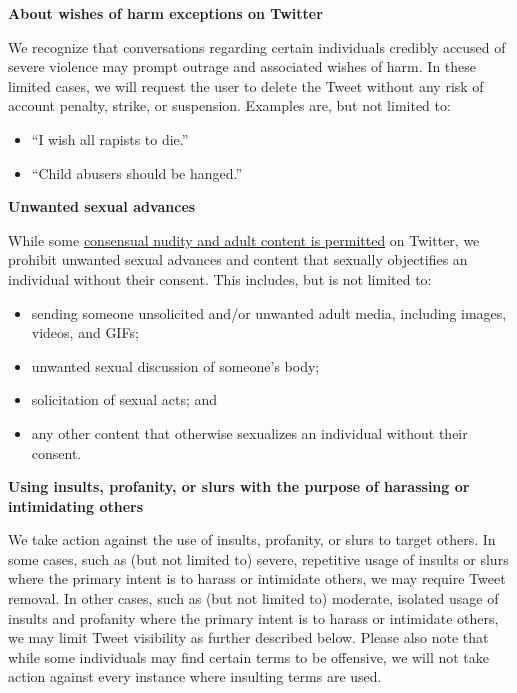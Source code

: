 \vspace{.5em}\noindent\textbf{About wishes of harm exceptions on Twitter}

\noindent We recognize that conversations regarding certain individuals credibly
accused of severe violence may prompt outrage and associated wishes of harm. In
these limited cases, we will request the user to delete the Tweet without any
risk of account penalty, strike, or suspension. Examples are, but not limited
to:

\begin{itemize}
\item ``I wish all rapists to die.''
\item ``Child abusers should be hanged.''
\end{itemize}


\vspace{.5em}\noindent\textbf{Unwanted sexual advances}

\noindent While some
\href{https://web.archive.org/web/20220905021323/https://help.twitter.com/en/rules-and-policies/media-policy.html}{consensual
nudity and adult content is permitted} on Twitter, we prohibit unwanted sexual
advances and content that sexually objectifies an individual without their
consent. This includes, but is not limited to:

\begin{itemize}
\item sending someone unsolicited and/or unwanted adult media, including images, videos, and GIFs;
\item unwanted sexual discussion of someone’s body;
\item solicitation of sexual acts; and
\item any other content that otherwise sexualizes an individual without
    their consent.
\end{itemize}


\vspace{.5em}\noindent\textbf{Using insults, profanity, or slurs with the purpose
    of harassing or intimidating others}

\noindent We take action against the use of insults, profanity, or slurs to
target others. In some cases, such as (but not limited to) severe, repetitive
usage of insults or slurs where the primary intent is to harass or intimidate
others, we may require Tweet removal. In other cases, such as (but not limited
to) moderate, isolated usage of insults and profanity where the primary intent
is to harass or intimidate others, we may limit Tweet visibility as further
described below. Please also note that while some individuals may find certain
terms to be offensive, we will not take action against every instance where
insulting terms are used.


